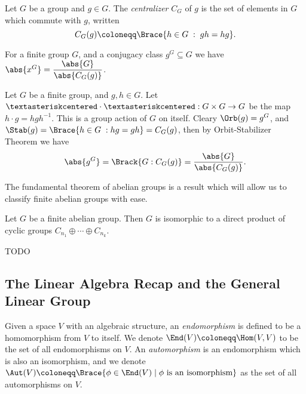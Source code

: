 \documentclass[../Project.tex]{subfiles}
\begin{document}
\begin{defi}
	Let $G$ be a group and $g \in G$. The \textit{centralizer} $C_G$ of $g$ is the set of elements in $G$ which commute with $g$, written
	$$C_G(g) \coloneqq \Brace{h \in G\;:\;gh = hg}.$$
\end{defi}

\begin{prop}[\cite{2}]
	\label{cardofconj}
	For a finite group $G$, and a conjugacy class $g^G \subseteq G$ we have $\abs{x^G} = \dfrac{\abs{G}}{\abs{C_G(g)}}$.
\end{prop}
\begin{proo*}
	Let $G$ be a finite group, and $g,h \in G$.
	Let $\textasteriskcentered \cdot \textasteriskcentered : G \times G \to G$ be the map
	$h \cdot g = hgh^{-1}$. This is a group action of $G$ on itself. Cleary $\Orb(g) = g^G$, and $\Stab(g) = \Brace{ h \in G \;: hg = gh} = C_G(g)$, then by Orbit-Stabilizer Theorem we have
	$$\abs{g^G} = \Brack{G : C_G(g)} = \frac{\abs{G}}{\abs{C_G(g)}}.$$
\end{proo*}
\newpage

The fundamental theorem of abelian groups is a result which will allow us to classify finite abelian groups with ease.
\begin{theo}
	\label{funtheoabelian}
	Let $G$ be a finite abelian group. Then $G$ is isomorphic to a direct product of cyclic groups $C_{n_1} \oplus \cdots \oplus C_{n_k}$.
\end{theo}
\begin{proo*}
	TODO
\end{proo*}
\newpage
\fi
\subsection{The Linear Algebra Recap and the General Linear Group}

\begin{defi}
	Given a space $V$ with an algebraic structure, an \textit{endomorphism} is defined to be a homomorphism from $V$ to itself. We denote $\End(V) \coloneqq \Hom(V,V)$ to be the set of all endomorphisms on $V$. An \textit{automorphism} is an endomorphism which is also an isomorphism, and we denote $\Aut(V) \coloneqq \Brace{\phi \in \End(V)\;|\;\phi \text{ is an isomorphism}}$ as the set of all automorphisms on $V$.\\
\end{defi}
\end{document}
